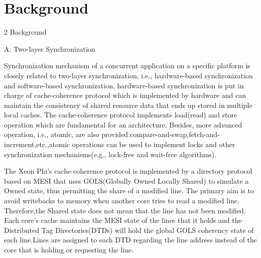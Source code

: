 \section{Background}
	\label{sec:background}
	
2 Background

A. Two-layer Synchronization

Synchronization mechanism of a concurrent application on a specific platform is closely related to two-layer synchronization, i.e., hardware-based synchronization and software-based synchronization, hardware-based synchronization is put in charge of cache-coherence protocol which is implemented by hardware and can maintain the consistency of shared resource data that ends up stored in multiple local caches. The cache-coherence protocol implements load(read) and store operation which are fundamental for an architecture. Besides, more advanced operation, i.e.,  atomic, are also provided:compare-and-swap,fetch-and-increment,etc.,atomic operations can be used to implement locks and other synchronization mechanisms(e.g., lock-free and wait-free algorithms).  

The Xeon Phi's cache-coherence protocol is implemented by a directory protocol based on MESI that uses GOLS(Globally Owned Locally Shared) to simulate a Owned state, thus permitting the share of a modified line. The primary aim is to avoid writebacks to memory when another core tries to read a modified line. Therefore,the Shared state does not mean that the line has not been modified. Each core's cache maintains the MESI state of the lines that it holds and the Distributed Tag Directories(DTDs) will hold the global GOLS coherency state of each line.Lines are assigned to each DTD regarding the line address instead of the core that is holding or requesting the line.

